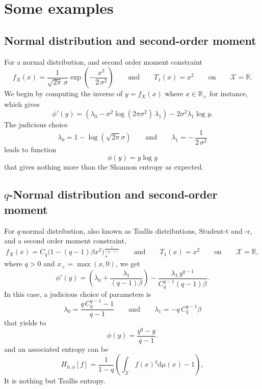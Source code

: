 \documentclass[english]{elsarticle}
\theoremstyle{definition}
\theoremstyle{plain}
\theoremstyle{plain}
\def\dmu{\mathrm{d}\mu}
\def\Rset{\mathbb{R}}
\def\X{\mathcal{X}}
\begin{document}
\section{Some examples}

\label{sec:Examples}




\subsection{Normal distribution and second-order moment}

\label{subsec:NormalSecondOrder}

For a normal distribution, and second order moment constraint 
\[
f_{X}(x)=\frac{1}{\sqrt{2\pi}\,\sigma}\exp\left(-\frac{x^{2}}{2\,\sigma^{2}}\right)\qquad\mbox{and}\qquad T_{1}(x)=x^{2}\qquad\mbox{on}\qquad\X=\Rset.
\]
We begin by computing the inverse of $y=f_{X}(x)$ where $x\in\Rset_{+}$
for instance, which gives 
\[
\phi'(y)=\left(\lambda_{0}-\sigma^{2}\log(2\pi\sigma^{2})\,\lambda_{1}\right)-2\sigma^{2}\lambda_{1}\log y.
\]
The judicious choice 
\[
\lambda_{0}=1-\log(\sqrt{2\pi}\sigma)\qquad\mbox{and}\qquad\lambda_{1}=-\,\frac{1}{2\,\sigma^{2}}
\]
leads to function 
\[
\phi(y)=y\log y
\]
that gives nothing more than the Shannon entropy as expected.




\subsection{$q$-Normal distribution and second-order moment}

\label{subsec:qNormalSecondOrder}

For $q$-normal distribution, also known as Tsallis distributions,
Student-t and -r, and a second order moment constraint, 
\[
f_{X}(x)=C_{q}\Big(1-(q-1)\beta x^{2}\Big)_{\!+}^{\frac{1}{(q-1)}}\qquad\mbox{and}\qquad T_{1}(x)=x^{2}\qquad\mbox{on}\qquad\X=\Rset,
\]
where $q>0$ and $x_{+}=\max(x,0)$, we get 
\[
\phi'(y)=\left(\lambda_{0}+\frac{\lambda_{1}}{(q-1)\beta}\right)-\frac{\lambda_{1}\, y^{q-1}}{C_{q}^{q-1}(q-1)\beta}.
\]
In this case, a judicious choice of parameters is 
\[
\lambda_{0}=\frac{q\, C_{q}^{q-1}-1}{q-1}\qquad\mbox{and}\qquad\lambda_{1}=-q\, C_{q}^{q-1}\beta
\]
that yields to 
\[
\phi(y)=\frac{y^{q}-y}{q-1}.
\]
and an associated entropy can be 
\[
H_{h,\phi}[f]=\frac{1}{1-q}\left(\int_{\X}f(x)^{q}\dmu(x)-1\right),
\]
It is nothing but Tsallis entropy. %
\end{document}
